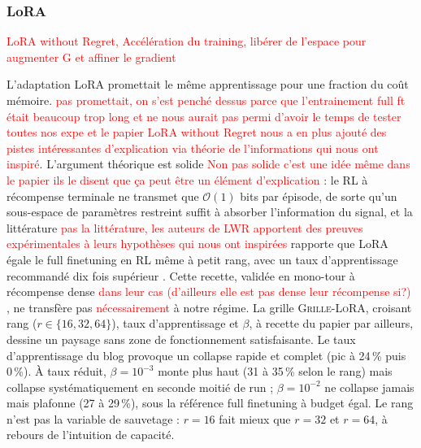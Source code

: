 \documentclass[11pt,a4paper]{article}
\begin{document}
\subsubsection{LoRA}

\textcolor{red}{LoRA without Regret, Accélération du training, libérer de l'espace pour augmenter G et affiner le gradient} 

L'adaptation LoRA promettait le même apprentissage pour une fraction du coût mémoire. \textcolor{red}{pas promettait, on s'est penché dessus parce que l'entrainement full ft était beaucoup trop long et ne nous aurait pas permi d'avoir le temps de tester toutes nos expe et le papier LoRA without Regret nous a en plus ajouté des pistes intéressantes d'explication via théorie de l'informations qui nous ont inspiré}. L'argument théorique est solide \textcolor{red}{Non pas solide c'est une idée même dans le papier ils le disent que ça peut être un élément d'explication}  : le RL à récompense terminale ne transmet que $\mathcal{O}(1)$ bits par épisode, de sorte qu'un sous-espace de paramètres restreint suffit à absorber l'information du signal, et la littérature \textcolor{red}{pas la littérature, les auteurs de LWR apportent des preuves expérimentales à leurs hypothèses qui nous ont inspirées} rapporte que LoRA égale le full finetuning en RL même à petit rang, avec un taux d'apprentissage recommandé dix fois supérieur \cite{schulman2025lora}. Cette recette, validée en mono-tour à récompense dense \textcolor{red}{dans leur cas (d'ailleurs elle est pas dense leur récompense si?)} , ne transfère pas \textcolor{red}{nécessairement} à notre régime. La grille \textsc{Grille-LoRA}, croisant rang ($r \in \{16, 32, 64\}$), taux d'apprentissage et $\beta$, à recette du papier par ailleurs, dessine un paysage sans zone de fonctionnement satisfaisante. Le taux d'apprentissage du blog provoque un collapse rapide et complet (pic à 24\,\% puis 0\,\%). À taux réduit, $\beta = 10^{-3}$ monte plus haut (31 à 35\,\% selon le rang) mais collapse systématiquement en seconde moitié de run ; $\beta = 10^{-2}$ ne collapse jamais mais plafonne (27 à 29\,\%), sous la référence full finetuning à budget égal. Le rang n'est pas la variable de sauvetage : $r=16$ fait mieux que $r=32$ et $r=64$, à rebours de l'intuition de capacité.
\end{document}
